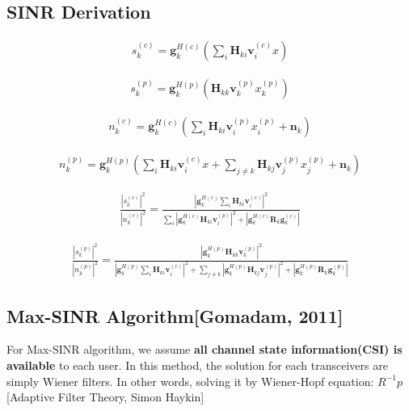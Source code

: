 \documentclass[11pt, oneside]{article}   	%
\begin{document}
\subsection{SINR Derivation}
\begin{align*}
s^{(c)}_{k} = \textbf{g}^{H(c)}_{k}
		(\displaystyle\sum_{i}
		\textbf{H}_{ki} 
		\textbf{v}^{(c)}_{i}x)
\end{align*}

\begin{align*}
s^{(p)}_{k} = \textbf{g}^{H(p)}_{k}
		(\textbf{H}_{kk} 
		\textbf{v}^{(p)}_{k}x^{(p)}_{k})
\end{align*}

\begin{align*}
n^{(c)}_{k} = \textbf{g}^{H(c)}_{k}
		(\displaystyle\sum_{i}
		\textbf{H}_{ki} 
		\textbf{v}^{(p)}_{i}x^{(p)}_{i}
		+\textbf{n}_{k})
\end{align*}

\begin{align*}
n^{(p)}_{k} = \textbf{g}^{H(p)}_{k}
		(\displaystyle\sum_{i}
		\textbf{H}_{ki} 
		\textbf{v}^{(c)}_{i}x
		+\displaystyle\sum_{j \neq k}\textbf{H}_{kj}\textbf{v}^{(p)}_{j}x^{(p)}_{j}
		+\textbf{n}_{k})
\end{align*}

\begin{align*}
\frac	{	|s^{(c)}_{k}|^2	}{	|n^{(c)}_{k}|^2	} = 
\frac {	|\textbf{g}^{H(c)}_{k}
		\displaystyle\sum_{i}
		\textbf{H}_{ki} 
		\textbf{v}^{(c)}_{i}|^2	
	} 
	{	\displaystyle\sum_{i}
		|\textbf{g}^{H(c)}_{k}
		\textbf{H}_{ki} 
		\textbf{v}^{(p)}_{i}|^2
		+|\textbf{g}^{H(c)}_{k}
		\textbf{R}_{k}
		\textbf{g}^{(c)}_{k}|
	}
\end{align*}

\begin{align*}
\frac	{	|s^{(p)}_{k}|^2	}{	|n^{(p)}_{k}|^2	} = 
\frac {|\textbf{g}^{H(p)}_{k}
		\textbf{H}_{kk} 
		\textbf{v}^{(p)}_{k}|^2	
	} 
	{	|\textbf{g}^{H(p)}_{k}
		\displaystyle\sum_{i}
		\textbf{H}_{ki} 
		\textbf{v}^{(c)}_{i}|^2
		+\displaystyle\sum_{j \neq k}
		|\textbf{g}^{H(p)}_{k}
		\textbf{H}_{kj} 
		\textbf{v}^{(p)}_{j}|^2
		+|\textbf{g}^{H(p)}_{k}
		\textbf{R}_{k}
		\textbf{g}^{(p)}_{k}|
	}
\end{align*}

\subsection{Max-SINR Algorithm[Gomadam, 2011]}
For Max-SINR algorithm, we assume \textbf{all channel state information(CSI) is available} to each user. In this method, the solution for each transceivers  are simply Wiener filters. In other words, solving it by Wiener-Hopf equation: $R^{-1}p$ [Adaptive Filter Theory, Simon Haykin]
\end{document}
